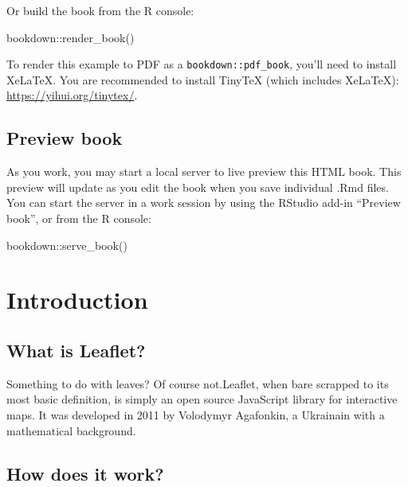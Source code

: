 \documentclass[
]{book}
\newenvironment{Shaded}{\begin{snugshade}}{\end{snugshade}}
\newcommand{\FunctionTok}[1]{\textcolor[rgb]{0.00,0.00,0.00}{#1}}
\newcommand{\NormalTok}[1]{#1}
\newcommand{\SpecialCharTok}[1]{\textcolor[rgb]{0.00,0.00,0.00}{#1}}
\begin{document}
Or build the book from the R console:

\begin{Shaded}
\begin{Highlighting}[]
\NormalTok{bookdown}\SpecialCharTok{::}\FunctionTok{render\_book}\NormalTok{()}
\end{Highlighting}
\end{Shaded}

To render this example to PDF as a \texttt{bookdown::pdf\_book}, you'll need to install XeLaTeX. You are recommended to install TinyTeX (which includes XeLaTeX): \url{https://yihui.org/tinytex/}.

\hypertarget{preview-book}{%
\section*{Preview book}\label{preview-book}}

As you work, you may start a local server to live preview this HTML book. This preview will update as you edit the book when you save individual .Rmd files. You can start the server in a work session by using the RStudio add-in ``Preview book'', or from the R console:

\begin{Shaded}
\begin{Highlighting}[]
\NormalTok{bookdown}\SpecialCharTok{::}\FunctionTok{serve\_book}\NormalTok{()}
\end{Highlighting}
\end{Shaded}

\hypertarget{introduction}{%
\chapter{Introduction}\label{introduction}}

\hypertarget{what-is-leaflet}{%
\section{What is Leaflet?}\label{what-is-leaflet}}

Something to do with leaves? Of course not.Leaflet, when bare scrapped to its most basic definition, is simply an open source JavaScript library for interactive maps. It was developed in 2011 by Volodymyr Agafonkin, a Ukrainain with a mathematical background.

\hypertarget{how-does-it-work}{%
\section{How does it work?}\label{how-does-it-work}}
\end{document}
